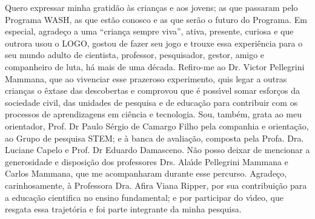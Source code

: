 \begin{agradecimentos}
Quero expressar minha gratid\~ao \`as crian\c{c}as e aos jovens; as que passaram pelo Programa WASH, as que est\~ao conosco e as que ser\~ao o futuro do Programa.
Em especial, agrade\c{c}o a uma “crian\c{c}a sempre viva”, ativa, presente, curiosa e que outrora usou o LOGO, gostou de fazer seu jogo e trouxe essa experi\^encia para o seu mundo adulto de cientista, professor, pesquisador, gestor, amigo e companheiro de luta, h\'a mais de uma d\'ecada. Refiro-me ao Dr. Victor Pellegrini Mammana, que ao vivenciar esse prazeroso experimento, quis legar a outras crian\c{c}as o \^extase das descobertas e comprovou que \'e poss\'{\i}vel somar esfor\c{c}os da sociedade civil, das unidades de pesquisa e de educa\c{c}\~ao para contribuir com os processos de aprendizagens em ci\^encia e tecnologia.
Sou, tamb\'em, grata ao meu orientador, Prof. Dr Paulo S\'ergio de Camargo Filho pela companhia e orienta\c{c}\~ao, ao Grupo de pesquisa STEM; e \`a banca de avalia\c{c}\~ao, composta pela Profa. Dra. Luciane Capelo e Prof. Dr Eduardo Damasceno.
N\~ao posso deixar de mencionar a generosidade e disposi\c{c}\~ao dos professores Drs. Ala\'{\i}de Pellegrini Mammana e Carlos Mammana, que me acompanharam durante esse percurso.
Agrade\c{c}o, carinhosamente, \`a Professora Dra. Afira Viana Ripper, por sua contribui\c{c}\~ao para a educa\c{c}\~ao cientifica no ensino fundamental; e por participar do v\'{\i}deo, que resgata essa trajet\'oria e foi parte integrante da minha pesquisa.

\end{agradecimentos}
